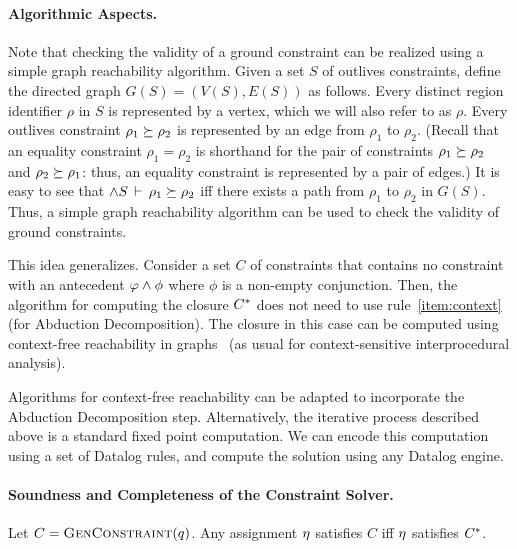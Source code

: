\paragraph{Algorithmic Aspects.}
Note that checking the validity of a ground constraint can be realized using
a simple graph reachability algorithm.
%
Given a set $S$ of outlives constraints, define the directed
graph $G(S)=(V(S),E(S))$ as follows.
Every distinct region identifier $\rho$ in $S$ is represented by a vertex,
which we will also refer to as $\rho$.
Every outlives constraint $\rho_1 \succeq \rho_2$ is represented by
an edge from $\rho_1$ to $\rho_2$.
(Recall that an equality constraint $\rho_1 = \rho_2$ is shorthand
for the pair of constraints $\rho_1 \succeq \rho_2$ and
$\rho_2 \succeq \rho_1$: thus, an equality constraint is represented
by a pair of edges.)
%
It is easy to see that $\wedge S\,\vdash\,\rho_1 \succeq \rho_2$ iff
there exists a path from $\rho_1$ to $\rho_2$ in $G(S)$.
%
Thus, a simple graph reachability algorithm can be used to check the validity of
ground constraints.

This idea generalizes. Consider a set $C$ of constraints that contains no
constraint with an antecedent $\varphi \wedge \phi$ where $\phi$ is a non-empty conjunction. 
Then, the algorithm for computing the closure ${C}^*$ does not need to use
rule~\ref{item:context} (for Abduction Decomposition). The closure in this
case can be computed using context-free reachability in graphs~\cite{Reps:Reachability}
(as usual for context-sensitive interprocedural analysis).

Algorithms for context-free reachability can be adapted to incorporate
the Abduction Decomposition step.
Alternatively, the iterative process described above is a standard fixed point computation.
We can encode this computation using a set of Datalog rules,
and compute the solution using any Datalog engine.

\paragraph{Soundness and Completeness of the Constraint Solver.}

\begin{theorem}
  \label{thm:closure}
Let $C = \textsc{GenConstraint}(q)$.
Any assignment $\eta$ satisfies $C$ iff $\eta$ satisfies ${C}^*$.
\end{theorem}

